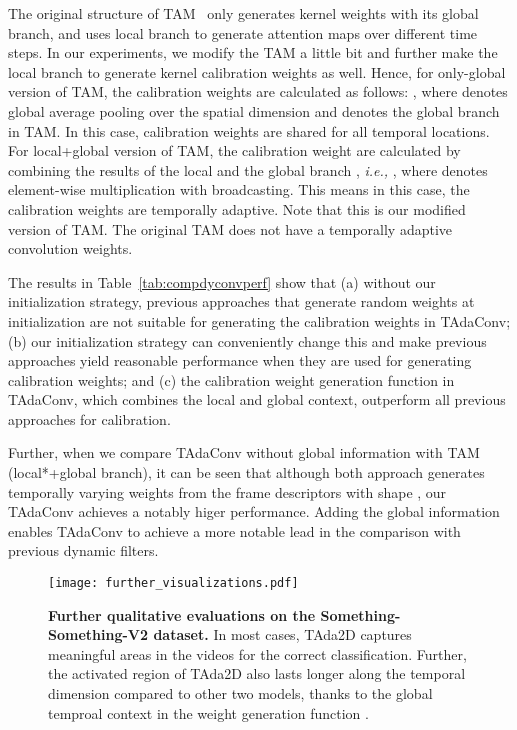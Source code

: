 \documentclass{article} \usepackage{iclr2022_conference,times}
\begin{document}
The original structure of TAM~\citep{tam} only generates kernel weights with its global branch, and uses local branch to generate attention maps over different time steps. 
In our experiments, we modify the TAM a little bit and further make the local branch to generate kernel calibration weights as well. 
Hence, for only-global version of TAM, the calibration weights are calculated as follows: , where  denotes global average pooling over the spatial dimension and  denotes the global branch in TAM.
In this case, calibration weights are shared for all temporal locations.
For local+global version of TAM, the calibration weight are calculated by combining the results of the local  and the global branch , \textit{i.e.,} , where  denotes element-wise multiplication with broadcasting.
This means in this case, the calibration weights are temporally adaptive. Note that this is our modified version of TAM. The original TAM does not have a temporally adaptive convolution weights.

The results in Table~\ref{tab:compdyconvperf} show that (a) without our initialization strategy, previous approaches that generate random weights at initialization are not suitable for generating the calibration weights in TAdaConv; (b) our initialization strategy can conveniently change this and make previous approaches yield reasonable performance when they are used for generating calibration weights; and (c) the calibration weight generation function in TAdaConv, which combines the local and global context, outperform all previous approaches for calibration.

Further, when we compare TAdaConv without global information with TAM (local*+global branch), it can be seen that although both approach generates temporally varying weights from the frame descriptors  with shape , our TAdaConv achieves a notably higer performance. Adding the global information enables TAdaConv to achieve a more notable lead in the comparison with previous dynamic filters.

\begin{figure}[t]
\centering
\texttt{[image: further\_visualizations.pdf]}
\caption{\textbf{Further qualitative evaluations on the Something-Something-V2 dataset.} In most cases, TAda2D captures meaningful areas in the videos for the correct classification. Further, the activated region of TAda2D also lasts longer along the temporal dimension compared to other two models, thanks to the global temproal context in the weight generation function . }
\label{fig:furtherqualitative}
\end{figure}
\end{document}
